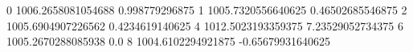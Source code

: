 0 1006.2658081054688 0.998779296875
1 1005.7320556640625 0.46502685546875
2 1005.6904907226562 0.4234619140625
4 1012.5023193359375 7.23529052734375
6 1005.2670288085938 0.0
8 1004.6102294921875 -0.65679931640625
